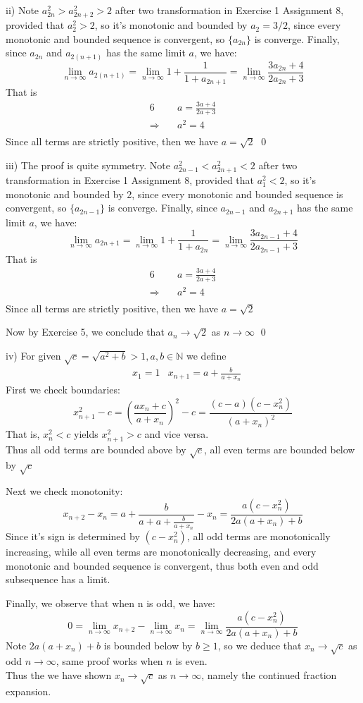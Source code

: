 \documentclass[12pt]{article}
\begin{document}
ii) Note $a_{2n}^2>a_{2n+2}^2>2$ after two transformation in Exercise 1 Assignment 8, provided that $a_2^2>2$, so it's monotonic and bounded by $a_2=3/2$, since every monotonic and bounded sequence is convergent, so $\{a_{2n}\}$ is converge. Finally, since $a_{2n}$ and $a_{2(n+1)}$ has the same limit $a$, we have:
\[
\lim_{n\to \infty}a_{2(n+1)}=\lim_{n\to\infty}1+\frac{1}{1+a_{2n+1}}=\lim_{n\to\infty}\frac{3a_{2n}+4}{2a_{2n}+3}
\]
That is
\begin{alignat*}{6}
&a=\frac{3a+4}{2a+3}\\
\Longrightarrow \quad&a^2=4\\
\end{alignat*}
Since all terms are strictly positive, then we have $a=\sqrt2$
\qed\par
iii) The proof is quite symmetry. Note $a_{2n-1}^2<a_{2n+1}^2<2$ after two transformation in Exercise 1 Assignment 8, provided that $a_1^2<2$, so it's monotonic and bounded by 2, since every monotonic and bounded sequence is convergent, so $\{a_{2n-1}\}$ is converge. Finally, since $a_{2n-1}$ and $a_{2n+1}$ has the same limit $a$, we have:
\[
\lim_{n\to \infty}a_{2n+1}=\lim_{n\to\infty}1+\frac{1}{1+a_{2n}}=\lim_{n\to\infty}\frac{3a_{2n-1}+4}{2a_{2n-1}+3}
\]
That is
\begin{alignat*}{6}
&a=\frac{3a+4}{2a+3}\\
\Longrightarrow \quad&a^2=4\\
\end{alignat*}
Since all terms are strictly positive, then we have $a=\sqrt2$\par
Now by Exercise 5, we conclude that $a_n\to\sqrt 2$ as $n\to\infty$
\qed\par
iv) For given $\sqrt c=\sqrt{a^2+b}>1,a,b\in \mathbb{N}$ we define
\begin{align*}
&x_1=1
&x_{n+1}=a+\frac{b}{a+x_n}
\end{align*}
First we check boundaries:
\[
{x_{n+1}^2-c=\left(\frac{ax_n+c}{a+x_n}\right)^2-c=\frac{(c-a)(c-x_n^2)}{(a+x_n)^2}}
\]
That is, $x_n^2<c$ yields $x_{n+1}^2>c$ and vice versa.\\
Thus all odd terms are bounded above by $\sqrt c$, all even terms are bounded below by $\sqrt c$
\par
Next we check monotonity:
\[
x_{n+2}-x_{n}=a+\frac{b}{a+a+\frac{b}{a+x_n}}-x_n=\frac{a(c-x_n^2)}{2a(a+x_n)+b}
\]
Since it's sign is determined by $(c-x_n^2)$, all odd terms are monotonically increasing, while all even terms are monotonically decreasing, and every monotonic and bounded sequence is convergent, thus both even and odd subsequence has a limit.\par
Finally, we observe that when n is odd, we have:
\[
0=\lim_{n\to\infty}x_{n+2}-\lim_{n\to\infty}x_n=\lim_{n\to\infty}\frac{a(c-x_n^2)}{2a(a+x_n)+b}
\]
Note $2a(a+x_n)+b$ is bounded below by $b\ge 1$, so we deduce that $x_n\to\sqrt c$ as odd $n\to\infty$, same proof works when $n$ is even.\\
Thus the we have shown $x_n\to\sqrt c$ as $n\to\infty$, namely the continued fraction expansion.\par
\end{document}
